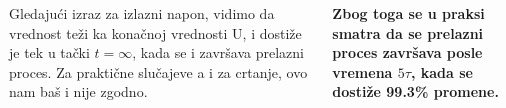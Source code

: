 \begin{frame}[label=08-s049]
\begin{columns}[c,onlytextwidth]\centering
{}\gusttekst
Gledajući izraz za izlazni napon, vidimo da vrednost teži ka konačnoj vrednosti U, i dostiže je tek u tački $t=\infty$, kada se i završava prelazni proces. Za praktične slučajeve a i za crtanje, ovo nam baš i nije zgodno.\par\bigskip
\textbf{Zbog toga se u praksi smatra da se prelazni proces završava posle vremena \alert{$5\tau$}, kada se dostiže 99.3\% promene.}
\end{columns}
\end{frame}
